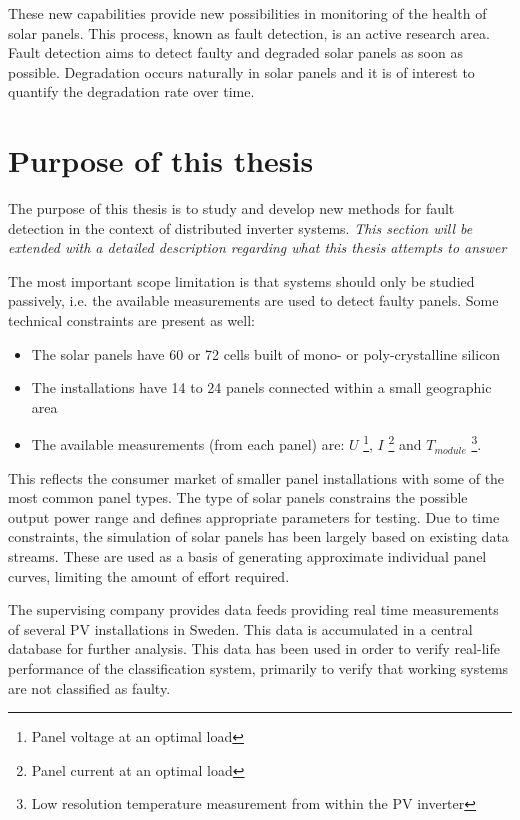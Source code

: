 These new capabilities provide new possibilities in monitoring of the health of solar panels.
This process, known as fault detection, is an active research area.
Fault detection aims to detect faulty and degraded solar panels as soon as possible. 
Degradation occurs naturally in solar panels and it is of interest to quantify the degradation rate over time.

\section{Purpose of this thesis}
The purpose of this thesis is to study and develop new methods for fault detection in the context of distributed inverter systems.
\emph{This section will be extended with a detailed description regarding what this thesis attempts to answer}

The most important scope limitation is that systems should only be studied passively, i.e. the available measurements are used to detect faulty panels.  
Some technical constraints are present as well:
\begin{itemize}
\item The solar panels have 60 or 72 cells built of mono- or poly-crystalline silicon
\item The installations have 14 to 24 panels connected within a small geographic area
\item The available measurements (from each panel) are:
$U$ \footnote{Panel voltage at an optimal load},
$I$ \footnote{Panel current at an optimal load} and
$T_{module}$ \footnote{Low resolution temperature measurement from within the PV inverter}.

\end{itemize}

This reflects the consumer market of smaller panel installations with some of the most common panel types.
The type of solar panels constrains the possible output power range and defines appropriate parameters for testing.
Due to time constraints, the simulation of solar panels has been largely based on existing data streams.
These are used as a basis of generating approximate individual panel curves, limiting the amount of effort required.

The supervising company provides data feeds providing real time measurements of several PV installations in Sweden.
This data is accumulated in a central database for further analysis.
This data has been used in order to verify real-life performance of the classification system, primarily to verify that working systems are not classified as faulty.

